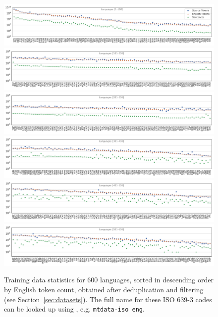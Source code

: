 \begin{figure}[h!t]
\centering
    \includegraphics[width=\linewidth,trim={5mm 5mm 6mm 5mm},clip]{img/manyeng/v2-lang-stats-1-100.pdf}
    \includegraphics[width=\linewidth,trim={5mm 5mm 6mm 5mm},clip]{img/manyeng/v2-lang-stats-101-200.pdf}
    \includegraphics[width=\linewidth,trim={5mm 5mm 6mm 5mm},clip]{img/manyeng/v2-lang-stats-201-300.pdf}
    \includegraphics[width=\linewidth,trim={5mm 5mm 6mm 5mm},clip]{img/manyeng/v2-lang-stats-301-400.pdf}
    \includegraphics[width=\linewidth,trim={5mm 5mm 6mm 5mm},clip]{img/manyeng/v2-lang-stats-401-500.pdf}     
    \includegraphics[width=\linewidth,trim={5mm 5mm 6mm 5mm},clip]{img/manyeng/v2-lang-stats-501-600.pdf}
    
    \caption{Training data statistics for 600 languages, sorted in descending order by English token count,  obtained after deduplication and filtering (see Section~\ref{sec:datasets}). The full name for these ISO 639-3 codes can be looked up using \mtdata, e.g. \texttt{mtdata-iso eng}.}
     \label{fig:train-data-stats-v2}
\end{figure}

